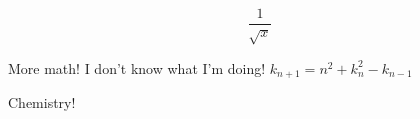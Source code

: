 \documentclass{article}
\begin{document}
\begin{equation*} %
	 \frac{1}{\sqrt{x}}
\end{equation*}

More math! I don't know what I'm doing! $k_{n+1} = n^2 + k_n^2 - k_{n-1}$





Chemistry!




\end{document}
